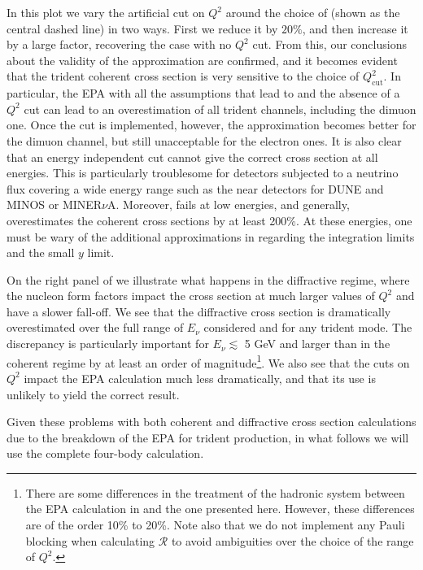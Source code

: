 %
 In this plot we vary the artificial cut on $Q^2$ around the choice of \cite{Magill:2016hgc} (shown as the central dashed line) in two ways. First we reduce it by $20 \%$, and then increase it by a large factor, recovering the case with no $Q^2$ cut. From this, our conclusions about the validity of the approximation are confirmed, and it becomes evident that the trident coherent cross section is very sensitive to the choice of $Q^2_{\mathrm{cut}}$. In particular, the EPA with all the assumptions that lead to  and the absence of a $Q^2$ cut can lead to an overestimation of all trident channels, including the dimuon one. Once the cut is implemented, however, the approximation becomes better for the dimuon channel, but still unacceptable for the electron ones. It is also clear that an energy independent cut cannot give the correct cross section at all energies. This is particularly troublesome for detectors subjected to a neutrino flux covering a wide energy range such as the near detectors for DUNE and  MINOS or MINER$\nu$A. Moreover,  fails at low energies, and generally, overestimates the coherent cross sections by at least  200\%. At these energies, one must be wary of the additional approximations in  regarding the integration limits and the small $y$ limit.     

On the right panel of  we illustrate what happens in the diffractive regime, where the nucleon form factors impact the cross section at much larger values of $Q^2$ and have a slower fall-off. We see that the diffractive cross section is dramatically overestimated over the full range of $E_\nu$ considered and for any trident mode. The discrepancy is particularly important for $E_\nu \lesssim$ 5 GeV and larger than in the coherent regime by at least an order of magnitude\footnote{There are some differences in the treatment of the hadronic system between the EPA calculation in \cite{Magill:2016hgc} and the one presented here. However, these differences are of the order 10\% to 20\%. Note also that we do not implement any Pauli blocking when calculating $\mathcal{R}$ to avoid ambiguities over the choice of the range of $Q^2$.}. We also see that the cuts on $Q^2$ impact the EPA calculation much less dramatically, and that its use is unlikely to yield the correct result.

Given these problems with both coherent and diffractive cross section calculations due to the breakdown of the EPA for trident production, in what follows we will use the complete four-body calculation.

